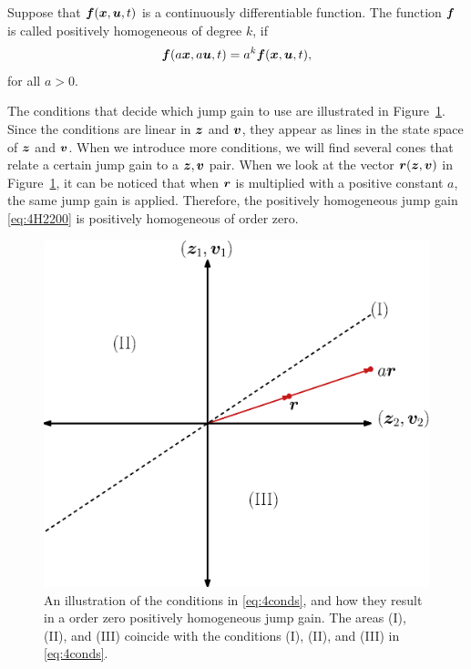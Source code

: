 \documentclass[../DC2017114Bouma.tex]{subfiles}
\begin{document}
\begin{sloppypar}
\begin{mydef}
Suppose that ${\boldsymbol{f}}({\boldsymbol{x}},{\boldsymbol{u}},t)$ is a continuously differentiable function. The function ${\boldsymbol{f}}$ is called positively homogeneous of degree $k$, if 
\begin{align}
{\boldsymbol{f}}(a{\boldsymbol{x}},a{\boldsymbol{u}},t) = a^k{\boldsymbol{f}}({\boldsymbol{x}},{\boldsymbol{u}},t),
\end{align}
for all $a>0$.
\end{mydef}
\end{sloppypar}

The conditions that decide which jump gain to use are illustrated in Figure~\ref{fig:4cone}. Since the conditions are linear in ${\boldsymbol{z}}$ and ${\boldsymbol{v}}$, they appear as lines in the state space of ${\boldsymbol{z}}$ and ${\boldsymbol{v}}$. When we introduce more conditions, we will find several cones that relate a certain jump gain to a ${\boldsymbol{z}},{\boldsymbol{v}}$ pair. When we look at the vector ${\boldsymbol{r}}({\boldsymbol{z}},{\boldsymbol{v}})$ in Figure~\ref{fig:4cone}, it can be noticed that when ${\boldsymbol{r}}$ is multiplied with a positive constant $a$, the same jump gain is applied. Therefore, the positively homogeneous jump gain \eqref{eq:4H2200} is positively homogeneous of order zero.

\begin{figure}[H]
\centering
\includegraphics[width=.5\textwidth]{4cone.eps}\caption{An illustration of the conditions in \eqref{eq:4conds}, and how they result in a order zero positively homogeneous jump gain. The areas \textnormal{(I)}, \textnormal{(II)}, and \textnormal{(III)} coincide with the conditions \textnormal{(I)}, \textnormal{(II)}, and \textnormal{(III)} in \eqref{eq:4conds}.}\label{fig:4cone}
\end{figure}
\end{document}
